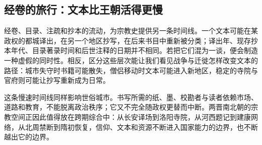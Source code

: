 \subsection{经卷的旅行：文本比王朝活得更慢}

经卷、目录、注疏和抄本的流动，为宗教史提供另一条时间线。一个文本可能在某政权的都城译出，在另一个地区抄写，在后来书目中重新被分类；译出年、现存抄本年代、目录著录时间和后世注释的日期并不相同。若把它们混为一谈，便会制造一种虚假的同时性。相反，区分这些层次能让我们看见战争与迁徙怎样改变文本的路径：城市失守时书籍可能散失，僧侣移动时文本可能进入新地区，稳定的寺院与官府则可能让抄写重新成为日常。

这条慢速时间线同样影响世俗城市。书写所需的纸、墨、校勘者与读者依赖市场、道路和教育，不能脱离政治秩序；它又不完全随政权更替而中断。两晋南北朝的宗教空间正因此值得放在跨期综合中：从长安译场到洛阳寺院，从河西题记到建康网络，从北周禁断到隋初恢复，信仰、文本和资源不断进入国家能力的边界，也不断越出它的边界。
